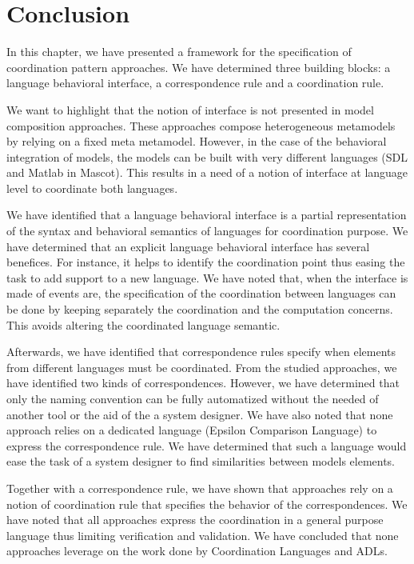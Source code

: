 \section{Conclusion}

In this chapter, we have presented a framework for the specification of coordination pattern approaches. We have determined three building blocks: a language behavioral interface, a correspondence rule and a coordination rule.    

We want to highlight that the notion of interface is not presented in model composition approaches. These approaches compose heterogeneous metamodels by relying on a fixed meta metamodel. However, in the case of the behavioral integration of models, the models can be built with very different languages (\eg SDL and Matlab in Mascot). This results in a need of a notion of interface at language level to coordinate both languages.   

We have identified that a language behavioral interface is a partial representation of the syntax and behavioral semantics of languages for coordination purpose. We have determined that an explicit language behavioral interface has several benefices. For instance, it helps to identify the coordination point thus easing the task to add support to a new language. We have noted that, when the interface is made of events are, the specification of the coordination between languages can be done by keeping separately the coordination and the computation concerns. This avoids altering the coordinated language semantic.

Afterwards, we have identified that correspondence rules specify when elements from different languages must be coordinated. From the studied approaches, we have identified two kinds of correspondences. However, we have determined that only the naming convention can be fully automatized without the needed of another tool or the aid of the a system designer. We have also noted that none approach relies on a dedicated language (\eg Epsilon Comparison Language) to express the correspondence rule. We have determined that such a language would ease the task of a system designer to find similarities between models elements.  

Together with a correspondence rule, we have shown that approaches rely on a notion of coordination rule that specifies the behavior of the correspondences. We have noted that all approaches express the coordination in a general purpose language thus limiting verification and validation. We have concluded that none approaches leverage on the work done by Coordination Languages and ADLs. 

